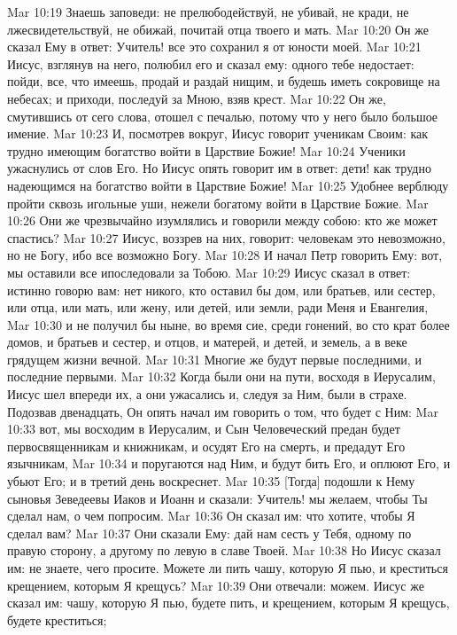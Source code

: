 Mar 10:19  Знаешь заповеди: не прелюбодействуй, не убивай, не кради, не лжесвидетельствуй, не обижай, почитай отца твоего и мать.
Mar 10:20  Он же сказал Ему в ответ: Учитель! все это сохранил я от юности моей.
Mar 10:21  Иисус, взглянув на него, полюбил его и сказал ему: одного тебе недостает: пойди, все, что имеешь, продай и раздай нищим, и будешь иметь сокровище на небесах; и приходи, последуй за Мною, взяв крест.
Mar 10:22  Он же, смутившись от сего слова, отошел с печалью, потому что у него было большое имение.
Mar 10:23  И, посмотрев вокруг, Иисус говорит ученикам Своим: как трудно имеющим богатство войти в Царствие Божие!
Mar 10:24  Ученики ужаснулись от слов Его. Но Иисус опять говорит им в ответ: дети! как трудно надеющимся на богатство войти в Царствие Божие!
Mar 10:25  Удобнее верблюду пройти сквозь игольные уши, нежели богатому войти в Царствие Божие.
Mar 10:26  Они же чрезвычайно изумлялись и говорили между собою: кто же может спастись?
Mar 10:27  Иисус, воззрев на них, говорит: человекам это невозможно, но не Богу, ибо все возможно Богу.
Mar 10:28  И начал Петр говорить Ему: вот, мы оставили все ипоследовали за Тобою.
Mar 10:29  Иисус сказал в ответ: истинно говорю вам: нет никого, кто оставил бы дом, или братьев, или сестер, или отца, или мать, или жену, или детей, или земли, ради Меня и Евангелия,
Mar 10:30  и не получил бы ныне, во время сие, среди гонений, во сто крат более домов, и братьев и сестер, и отцов, и матерей, и детей, и земель, а в веке грядущем жизни вечной.
Mar 10:31  Многие же будут первые последними, и последние первыми.
Mar 10:32  Когда были они на пути, восходя в Иерусалим, Иисус шел впереди их, а они ужасались и, следуя за Ним, были в страхе. Подозвав двенадцать, Он опять начал им говорить о том, что будет с Ним:
Mar 10:33  вот, мы восходим в Иерусалим, и Сын Человеческий предан будет первосвященникам и книжникам, и осудят Его на смерть, и предадут Его язычникам,
Mar 10:34  и поругаются над Ним, и будут бить Его, и оплюют Его, и убьют Его; и в третий день воскреснет.
Mar 10:35  [Тогда] подошли к Нему сыновья Зеведеевы Иаков и Иоанн и сказали: Учитель! мы желаем, чтобы Ты сделал нам, о чем попросим.
Mar 10:36  Он сказал им: что хотите, чтобы Я сделал вам?
Mar 10:37  Они сказали Ему: дай нам сесть у Тебя, одному по правую сторону, а другому по левую в славе Твоей.
Mar 10:38  Но Иисус сказал им: не знаете, чего просите. Можете ли пить чашу, которую Я пью, и креститься крещением, которым Я крещусь?
Mar 10:39  Они отвечали: можем. Иисус же сказал им: чашу, которую Я пью, будете пить, и крещением, которым Я крещусь, будете креститься;
